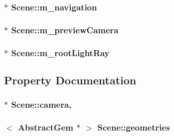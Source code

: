 \subsubsection[{m\+\_\+navigation}]{$\ast$ Scene\+::m\+\_\+navigation\hspace{0.3cm}{\ttfamily [protected]}}\label{class_scene_a595ab554271bd87c4c73f0cce175ff81}
\hypertarget{class_scene_af1841b6c042a5edcf39653706f17cdd1}{}
\subsubsection[{m\+\_\+preview\+Camera}]{$\ast$ Scene\+::m\+\_\+preview\+Camera\hspace{0.3cm}{\ttfamily [protected]}}\label{class_scene_af1841b6c042a5edcf39653706f17cdd1}
\hypertarget{class_scene_a766daf7b6a92c877f1fc57f3d8af9959}{}
\subsubsection[{m\+\_\+root\+Light\+Ray}]{$\ast$ Scene\+::m\+\_\+root\+Light\+Ray\hspace{0.3cm}{\ttfamily [protected]}}\label{class_scene_a766daf7b6a92c877f1fc57f3d8af9959}


\subsection{Property Documentation}
\hypertarget{class_scene_ab915c54546b8cecc3ae6bb7c8983518c}{}
\subsubsection[{camera}]{ $\ast$ Scene\+::camera\hspace{0.3cm}{\ttfamily [read]}, {\ttfamily [write]}}\label{class_scene_ab915c54546b8cecc3ae6bb7c8983518c}
\hypertarget{class_scene_a426e8a21801c9cc93c5cd90896ed745d}{}
\subsubsection[{geometries}]{$<$ {\bf Abstract\+Gem} $\ast$ $>$ Scene\+::geometries\hspace{0.3cm}{\ttfamily [read]}}\label{class_scene_a426e8a21801c9cc93c5cd90896ed745d}
\hypertarget{class_scene_ae8f457e7e69cac64f533e02f4f13e725}{}
